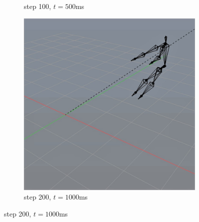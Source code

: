 \documentclass[10pt,twocolumn,letterpaper]{article}
\begin{document}
\begin{figure}[]
\begin{subfigure}{0.2\textwidth}
        \caption{step 100, $t=500$ms}
    \end{subfigure}\begin{subfigure}{0.2\textwidth}
        \centering
        \includegraphics[width=.9\linewidth]{linear-cannon-1000.jpg}
        \caption{step 200, $t=1000$ms}
    \end{subfigure}


\end{figure}
\end{document}
